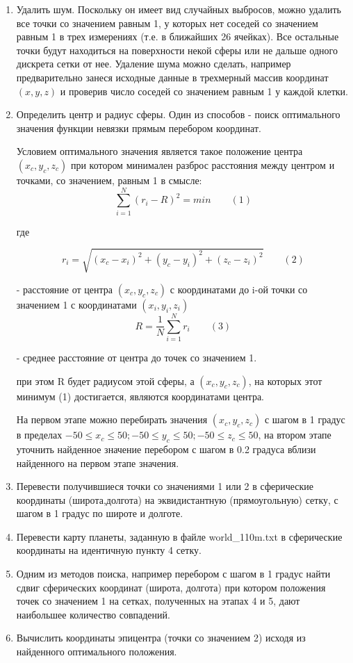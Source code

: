 \begin{enumerate}
    \item Удалить шум. Поскольку он имеет вид случайных выбросов, можно удалить все точки со значением равным 1, у которых нет соседей со значением равным 1 в трех измерениях (т.е. в ближайших 26 ячейках). Все остальные точки будут находиться на поверхности некой сферы или не дальше одного дискрета сетки от нее.  Удаление шума можно сделать, например предварительно занеся исходные данные в трехмерный массив координат $(x,y,z)$ и проверив число соседей со значением равным 1 у каждой клетки.
    \item Определить центр и радиус сферы. Один из способов - поиск оптимального значения функции невязки прямым перебором координат. 
    
    Условием оптимального значения является такое положение центра $(x_c, y_c, z_c)$ при котором  минимален разброс расстояния между центром и точками, со значением, равным 1 в смысле:
    $$\sum_{i=1}^N(r_i -R)^2 = min \qquad (1)$$
    
    где

    $$r_i = \sqrt{(x_c - x_i)^2 + (y_c - y_i)^2 + (z_c-z_i)^2} \qquad (2)$$
    
    - расстояние от центра $(x_c, y_c, z_c)$ с координатами до i-ой точки со значением 1 с координатами $(x_i, y_i, z_i)$
    $$R=\frac{1}{N} \sum_{i=1}^N r_i \qquad (3)$$
    
    - среднее расстояние от центра до точек со значением 1.

    при этом R будет радиусом этой сферы, а $(x_c, y_c, z_c)$, на которых этот минимум (1) достигается, являются координатами центра.

    На первом этапе можно перебирать значения $(x_c, y_c, z_c)$ с шагом в 1 градус в пределах  $-50 \leq x_c \leq 50; -50 \leq y_c \leq 50; -50 \leq z_c \leq 50$, на втором этапе уточнить найденное значение перебором с шагом в 0.2 градуса вблизи найденного на первом этапе значения. 

    \item Перевести получившиеся точки со значениями 1 или 2 в сферические координаты (широта,долгота) на эквидистантную (прямоугольную) сетку, с шагом в 1 градус по широте и долготе.
    \item Перевести карту планеты, заданную в файле world\_110m.txt в сферические координаты на идентичную пункту 4 сетку.
    \item Одним из методов поиска, например перебором с шагом в 1 градус найти  сдвиг сферических координат (широта, долгота) при котором положения точек со значением 1 на сетках, полученных на этапах 4 и 5, дают наибольшее количество совпадений. 
    \item Вычислить координаты эпицентра (точки со значением 2) исходя из найденного оптимального положения.
\end{enumerate}